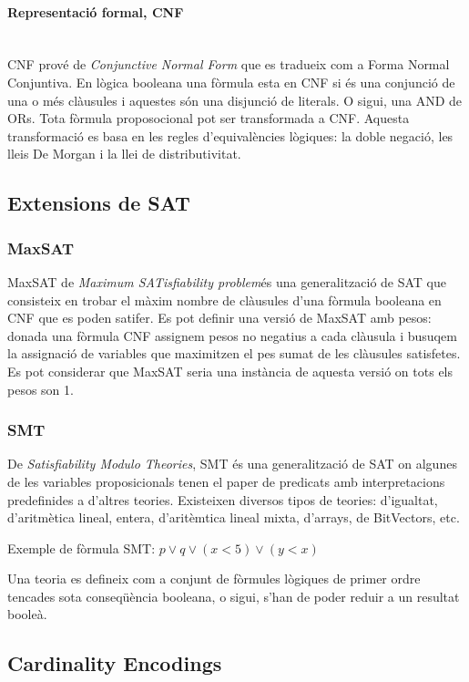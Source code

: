 \documentclass[11pt,a4paper,twoside]{report}
\begin{document}
  \paragraph*{Representació formal, CNF}~\\

  CNF prové de \textit{Conjunctive Normal Form} que es tradueix com a Forma Normal Conjuntiva. En lògica booleana una fòrmula esta en CNF si és una conjunció de una o més clàusules i aquestes són una disjunció de literals. O sigui, una AND de ORs. 
  Tota fòrmula proposocional pot ser transformada a CNF. Aquesta transformació es basa en les regles d'equivalències lògiques: la doble negació, les lleis De Morgan i la llei de distributivitat.  
  \subsection{Extensions de SAT}
  \subsubsection{MaxSAT}
  MaxSAT de \textit{Maximum SATisfiability problem}és una generalització de SAT que consisteix en trobar el màxim nombre de clàusules d'una fòrmula booleana en CNF que es poden satifer. 
  Es pot definir una versió de MaxSAT amb pesos: donada una fòrmula CNF assignem pesos no negatius a cada clàusula i busuqem la assignació de variables que maximitzen el pes sumat de les clàusules satisfetes. 
  Es pot considerar que MaxSAT seria una instància de aquesta versió on tots els pesos son 1. 
  \subsubsection{SMT}
  De \textit{Satisfiability Modulo Theories}, SMT és una generalització de SAT on algunes de les variables proposicionals tenen el paper de predicats amb interpretacions predefinides a d'altres teories. Existeixen diversos tipos de teories: d'igualtat, d'aritmètica lineal, entera, d'aritèmtica lineal mixta, d'arrays, de BitVectors, etc.
  
  Exemple de fòrmula SMT: $p \vee q \vee (x<5) \vee (y<x)$

  Una teoria es defineix com a conjunt de fòrmules lògiques de primer ordre tencades sota conseqüència booleana, o sigui, s'han de poder reduir a un resultat booleà. 
  \subsection{Cardinality Encodings}
  
\end{document}
